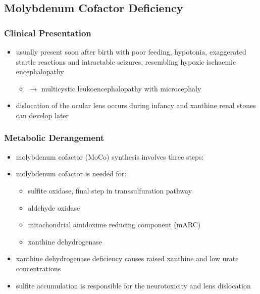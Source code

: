 \documentclass{scrartcl}
\begin{document}
\subsection{Molybdenum Cofactor Deficiency}
\label{sec:org522ac8d}
\subsubsection{Clinical Presentation}
\label{sec:org5ff2f83}
\begin{itemize}
\item usually present soon after birth with poor feeding, hypotonia,
exaggerated startle reactions and intractable seizures, resembling
hypoxic ischaemic encephalopathy
\begin{itemize}
\item \(\to\) multicystic leukoencephalopathy with microcephaly
\end{itemize}
\item dislocation of the ocular lens occurs during infancy and xanthine
renal stones can develop later
\end{itemize}

\subsubsection{Metabolic Derangement}
\label{sec:orgb5cad81}
\begin{itemize}
\item molybdenum cofactor (MoCo) synthesis involves three steps:
\item molybdenum cofactor is needed for:
\begin{itemize}
\item sulfite oxidase, final step in transsulfuration pathway
\item aldehyde oxidase
\item mitochondrial amidoxime reducing component (mARC)
\item xanthine dehydrogenase
\end{itemize}
\item xanthine dehydrogenase deficiency causes raised xanthine and low
urate concentrations
\item sulfite accumulation is responsible for the neurotoxicity and lens
dislocation
\end{itemize}
\end{document}
